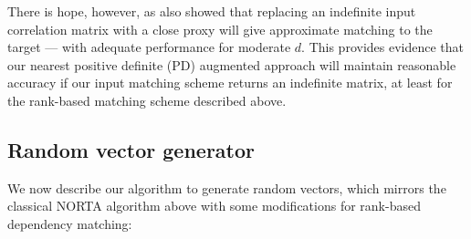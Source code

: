 \documentclass[
]{jss}
\begin{document}
There is hope, however, as \citet{GH02} also showed that replacing an
indefinite input correlation matrix with a close proxy will give
approximate matching to the target --- with adequate performance for
moderate \(d\). This provides evidence that our nearest positive
definite (PD) augmented approach will maintain reasonable accuracy if
our input matching scheme returns an indefinite matrix, at least for the
rank-based matching scheme described above.

\hypertarget{rand-vec-gen}{%
\subsection{Random vector generator}\label{rand-vec-gen}}

We now describe our algorithm to generate random vectors, which mirrors
the classical NORTA algorithm above with some modifications for
rank-based dependency matching:

\end{document}
